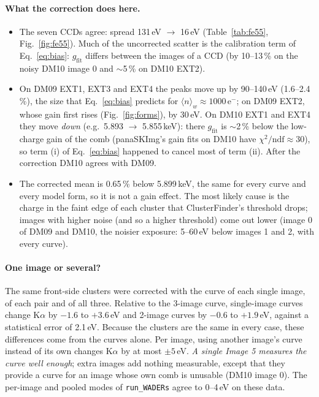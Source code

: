 \documentclass[11pt,a4paper]{article}
\newcommand{\code}[1]{\texttt{#1}}
\newcommand{\eminus}{e$^-$}
\newcommand{\gfit}{g_{\mathrm{fit}}}
\begin{document}
\paragraph{What the correction does here.}
\begin{itemize}
\item The seven CCDs agree: spread 131\,eV $\to$ 16\,eV (Table~\ref{tab:fe55}, Fig.~\ref{fig:fe55}). Much
of the uncorrected scatter is the calibration term of Eq.~\ref{eq:bias}: $\gfit$ differs between the
images of a CCD (by 10--13\,\% on the noisy DM10 image 0 and $\sim$5\,\% on DM10 EXT2).
\item On DM09 EXT1, EXT3 and EXT4 the peaks move up by 90--140\,eV (1.6--2.4\,\%), the size that
Eq.~\ref{eq:bias} predicts for $\langle n\rangle_w \approx 1000$\,\eminus; on DM09 EXT2, whose gain first rises
(Fig.~\ref{fig:forms}), by 30\,eV. On DM10 EXT1 and EXT4 they move \emph{down} (e.g.\ 5.893
$\to$ 5.855\,keV): there $\gfit$ is $\sim$2\,\% below the low-charge gain of the comb (panaSKImg's gain
fits on DM10 have $\chi^2/\mathrm{ndf} \approx 30$), so term (i) of Eq.~\ref{eq:bias} happened to cancel
most of term (ii). After the correction DM10 agrees with DM09.
\item The corrected mean is 0.65\,\% below 5.899\,keV, the same for every curve and every model form, so it
is not a gain effect. The most likely cause is the charge in the faint edge of each cluster that
ClusterFinder's threshold drops; images with higher noise (and so a higher threshold) come out lower
(image 0 of DM09 and DM10, the noisier exposure: 5--60\,eV below images 1 and 2, with every curve).
\end{itemize}

\paragraph{One image or several?} The same front-side clusters were corrected with the curve of each
single image, of each pair and of all three. Relative to the 3-image curve, single-image curves change
K$\alpha$ by $-1.6$ to $+3.6$\,eV and 2-image curves by $-0.6$ to $+1.9$\,eV, against a statistical error of
2.1\,eV. Because the clusters are the same in every case, these differences come from the curves alone.
Per image, using another image's curve instead of its own changes K$\alpha$ by at most $\pm 5$\,eV.
\emph{A single Image 5 measures the curve well enough}; extra images add nothing measurable, except that
they provide a curve for an image whose own comb is unusable (DM10 image 0). The per-image and pooled
modes of \code{run\_WADERs} agree to 0--4\,eV on these data.
\end{document}
